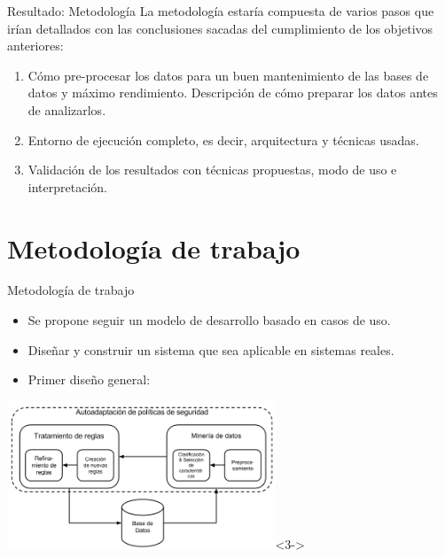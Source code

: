\documentclass{beamer}
\begin{document}
\begin{frame}{Resultado: Metodología}
La metodología estaría compuesta de varios pasos que irían detallados con las conclusiones sacadas del cumplimiento de los objetivos anteriores:

\begin{enumerate}
  \item<1-> Cómo pre-procesar los datos para un buen mantenimiento de las bases de datos y máximo rendimiento. Descripción de cómo preparar los datos antes de analizarlos.
  \item<2-> Entorno de ejecución completo, es decir, arquitectura y técnicas usadas.
  \item<3-> Validación de los resultados con técnicas propuestas, modo de uso e interpretación.
\end{enumerate}

\end{frame}

\section{Metodología de trabajo}

\begin{frame}{Metodología de trabajo}

\begin{itemize}
  \item<1-> Se propone seguir un modelo de desarrollo basado en casos de uso.
  \item<2-> Diseñar y construir un sistema que sea aplicable en sistemas reales.
  \item<3-> Primer diseño general:
\end{itemize}

\begin{center}
\includegraphics[width=0.6\textwidth]{./imgs/KRS.png}<3->
\end{center}

\end{frame}
\end{document}
